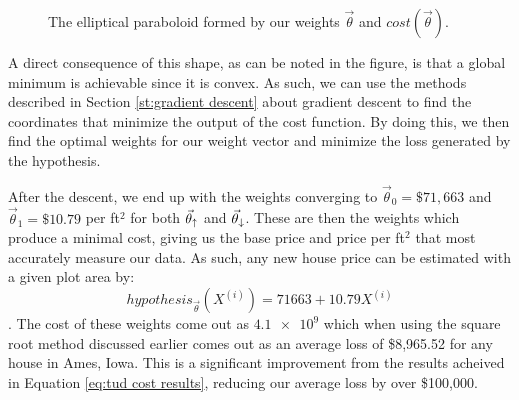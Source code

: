 \begin{figure}[t!]
    \centering
    \caption{The elliptical paraboloid formed by our weights $\vec\theta$ and $cost(\vec\theta)$.}
    \label{fg:cost}
\end{figure}

A direct consequence of this shape, as can be noted in the figure, is that a
global minimum is achievable since it is convex. As such, we can use
the methods described in Section \ref{st:gradient descent} about gradient
descent to find the coordinates that minimize the output of the cost function.
By doing this, we then find the optimal weights for our weight vector and
minimize the loss generated by the hypothesis.


 After the descent, we
end up with the weights converging to $\vec\theta_0 = \$71,663$ and
$\vec\theta_1 = \$10.79$ per ft$^2$ for both $\vec\theta_{\uparrow}$ and $\vec\theta_{\downarrow}$. These are then the
weights which produce a minimal cost, giving us the base price and price per
ft$^2$ that most accurately measure our data. As such, any new house price can
be estimated with a given plot area by:
\begin{equation}
    hypothesis_{\vec\theta}(X^{(i)}) = 71663 + 10.79X^{(i)}	
\end{equation}.
The cost of these weights come out as $\num{4.1e9}$ which when using the
square root method discussed earlier comes out as an average loss of \$8,965.52
for any house in Ames, Iowa. This is a significant improvement from the results
acheived in Equation \ref{eq:tud cost results}, reducing our
average loss by over \$100,000.



